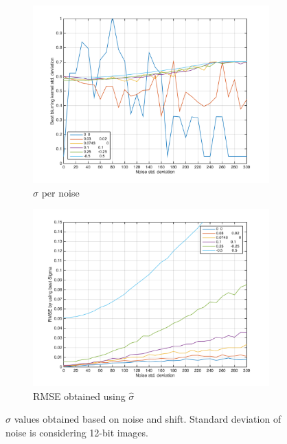 \begin{figure}[!ht]
\centering
\begin{subfigure}{0.45\textwidth}
	\includegraphics[width=1\textwidth]{Results/BestSigmaByShiftAndNoise}
	\caption{$\hat{\sigma}$ per noise}
\end{subfigure}	
\begin{subfigure}{0.45\textwidth}
	\includegraphics[width=1\textwidth]{Results/RMSEByShiftAndNoise}
	\caption{RMSE obtained using $\hat{\sigma}$}
\end{subfigure}	
\caption{$\hat{\sigma}$ values obtained based on noise and shift. Standard deviation of noise is considering 12-bit images.}
\label{fig:BestSigmaByNoiseAndShift}
\end{figure}

